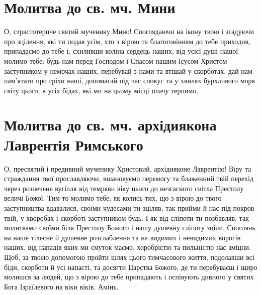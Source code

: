 \documentclass[chapters.tex]{subfiles}
\begin{document}
\section{Молитва до св. мч. Мини}
О, страстотерпче святий мученику Мино! Споглядаючи на ікону твою і згадуючи про зцілення, які ти подав усім, хто з вірою та благоговінням до тебе приходив, припадаємо до тебе і, схиливши коліна сердець наших, від усієї душі нашої молимо тебе: будь нам перед Господом і Спасом нашим Ісусом Христом заступником у немочах наших, перебувай з нами та втішай у скорботах, дай нам пам’ятати про гріхи наші, допомагай під час спокус та у хвилях бурхливого моря світу цього, в усіх бідах, які ми на цьому місці плачу терпимо.

\section{Молитва до св. мч. архідиякона Лаврентія Римського}
О, пресвятий і предивний мученику Христовий, архідияконе Лаврентію! Віру та страждання твої прославляючи, вшановуємо перемогу та блаженний твій перехід через розпечене вугілля від темряви віку цього до незгасного світла Престолу величі Божої. Тим-то молимо тебе: як колись тих, що з вірою до твого заступництва вдавалися, своїми чудесами ти зціляв, так прийми й нас під покров твій, у хворобах і скорботі заступником будь. І як від сліпоти ти позбавляв, так молитвами своїми біля Престолу Божого і нашу душевну сліпоту зціли. Споглянь на наше тілесне й душевне розслаблення та на видимих і невидимих ворогів наших, від нападів яких ми смуток маємо, хоробрістю та пильністю нас зміцни. Щоб, за твоєю допомогою пройти шлях цього тимчасового життя, подолавши всі біди, скорботи й усі напасті, та досягти Царства Божого, де ти перебуваєш і щиро молишся за людей, що з вірою до тебе припадають і оспівують дивного у святих Бога Ізраїлевого на віки віків. Амінь.
\end{document}
